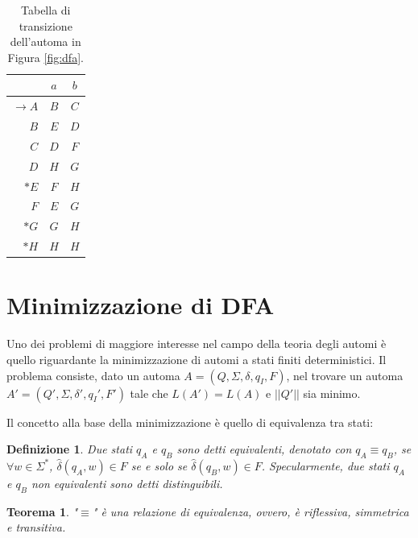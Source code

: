 \documentclass[a4paper,12pt]{report} %
\newtheorem{theorem}{Teorema}[chapter]        %
\newtheorem{definition}{Definizione}[chapter] %
\begin{document}
\begin{table}[!htb]
  \centering
  \begin{tabular}{r|c|c}
    \toprule
                      & $a$ & $b$ \\
    \midrule
    $\rightarrow A$   & $B$ & $C$ \\
    $B$               & $E$ & $D$ \\
    $C$               & $D$ & $F$ \\
    $D$               & $H$ & $G$ \\
    $*E$              & $F$ & $H$ \\
    $F$               & $E$ & $G$ \\
    $*G$              & $G$ & $H$ \\
    $*H$              & $H$ & $H$ \\
    \bottomrule
  \end{tabular}
  \caption{\label{tab:transitions}Tabella di transizione dell'automa in Figura \ref{fig:dfa}.}
\end{table}

\section{Minimizzazione di DFA}
\label{min-dfa}

Uno dei problemi di maggiore interesse nel campo della teoria degli automi è quello riguardante la minimizzazione di 
automi a stati finiti deterministici. Il problema consiste, dato un automa $A = (Q, \Sigma, \delta, q_I, F)$,
nel trovare un automa $A' = (Q', \Sigma, \delta', q_I', F')$ tale che $L(A') = L(A)$ e $||Q'||$ sia minimo.

Il concetto alla base della minimizzazione è quello di equivalenza tra stati:

\begin{definition}
  \label{def:eq-states}
  Due stati $q_A$ e $q_B$ sono detti \emph{equivalenti}, denotato con $q_A \equiv q_B$, 
  se $\forall w \in \Sigma^*$, $\hat{\delta}(q_A, w) \in F$ se e solo se $\hat{\delta}(q_B, w) \in F$.
  Specularmente, due stati $q_A$ e $q_B$ non equivalenti sono detti distinguibili.
\end{definition}

\begin{theorem}
  \label{th:eq-rel-states}
  "$\equiv$" è una relazione di equivalenza, ovvero, è riflessiva, simmetrica e transitiva.
\end{theorem}
\end{document}
